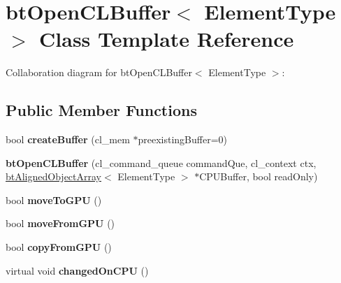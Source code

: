 \hypertarget{classbt_open_c_l_buffer}{\section{bt\+Open\+C\+L\+Buffer$<$ Element\+Type $>$ Class Template Reference}
\label{classbt_open_c_l_buffer}
}


Collaboration diagram for bt\+Open\+C\+L\+Buffer$<$ Element\+Type $>$\+:
\subsection*{Public Member Functions}
\begin{DoxyCompactItemize}
\item 
\hypertarget{classbt_open_c_l_buffer_ae5f7046b92895b4e767212bba4fcd0af}{bool {\bfseries create\+Buffer} (cl\+\_\+mem $\ast$preexisting\+Buffer=0)}\label{classbt_open_c_l_buffer_ae5f7046b92895b4e767212bba4fcd0af}

\item 
\hypertarget{classbt_open_c_l_buffer_a714422d0a62a01d28d6d0115ca6650c2}{{\bfseries bt\+Open\+C\+L\+Buffer} (cl\+\_\+command\+\_\+queue command\+Que, cl\+\_\+context ctx, \hyperlink{classbt_aligned_object_array}{bt\+Aligned\+Object\+Array}$<$ Element\+Type $>$ $\ast$C\+P\+U\+Buffer, bool read\+Only)}\label{classbt_open_c_l_buffer_a714422d0a62a01d28d6d0115ca6650c2}

\item 
\hypertarget{classbt_open_c_l_buffer_a29a7ebd5406bebd2eaa3de3380c3907a}{bool {\bfseries move\+To\+G\+P\+U} ()}\label{classbt_open_c_l_buffer_a29a7ebd5406bebd2eaa3de3380c3907a}

\item 
\hypertarget{classbt_open_c_l_buffer_a6555ee5c3a3d6e6d638590923cf9cbbf}{bool {\bfseries move\+From\+G\+P\+U} ()}\label{classbt_open_c_l_buffer_a6555ee5c3a3d6e6d638590923cf9cbbf}

\item 
\hypertarget{classbt_open_c_l_buffer_a88a86a86827389c4b9dcd2e2ff441875}{bool {\bfseries copy\+From\+G\+P\+U} ()}\label{classbt_open_c_l_buffer_a88a86a86827389c4b9dcd2e2ff441875}

\item 
\hypertarget{classbt_open_c_l_buffer_a2eda55c719099ee8751625283e47b638}{virtual void {\bfseries changed\+On\+C\+P\+U} ()}\label{classbt_open_c_l_buffer_a2eda55c719099ee8751625283e47b638}

\end{DoxyCompactItemize}
